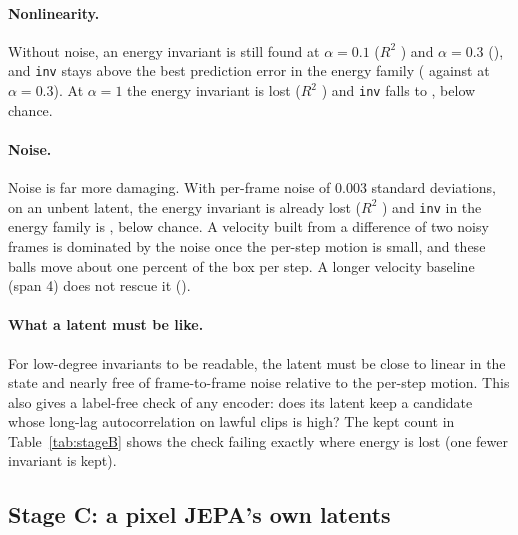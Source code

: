 \documentclass[11pt]{article}
\begin{document}


\paragraph{Nonlinearity.} Without noise, an energy invariant is still found at $\alpha = 0.1$
($R^2$ \BAZeroOneNZeroSOneRtwo{}) and $\alpha = 0.3$ (\BAZeroThreeNZeroSOneRtwo{}), and \texttt{inv}
stays above the best prediction error in the energy family (\BAZeroThreeNZeroSOneInv{} against
\BAZeroThreeNZeroSOnePe{} at $\alpha = 0.3$). At $\alpha = 1$ the energy invariant is lost ($R^2$
\BAOneNZeroSOneRtwo{}) and \texttt{inv} falls to \BAOneNZeroSOneInv{}, below chance.

\paragraph{Noise.} Noise is far more damaging. With per-frame noise of 0.003 standard deviations, on
an unbent latent, the energy invariant is already lost ($R^2$ \BAZeroNZeroZeroZeroThreeSOneRtwo{})
and \texttt{inv} in the energy family is \BAZeroNZeroZeroZeroThreeSOneInv{}, below chance. A
velocity built from a difference of two noisy frames is dominated by the noise once the per-step
motion is small, and these balls move about one percent of the box per step. A longer velocity
baseline (span 4) does not rescue it (\BAZeroNZeroZeroZeroThreeSFourInv{}).

\paragraph{What a latent must be like.} For low-degree invariants to be readable, the latent must
be close to linear in the state and nearly free of frame-to-frame noise relative to the per-step
motion. This also gives a label-free check of any encoder: does its latent keep a candidate whose
long-lag autocorrelation on lawful clips is high? The kept count in Table~\ref{tab:stageB} shows the
check failing exactly where energy is lost (one fewer invariant is kept).

\FloatBarrier
\subsection{Stage C: a pixel JEPA's own latents}\label{sec:stageC}
\end{document}
